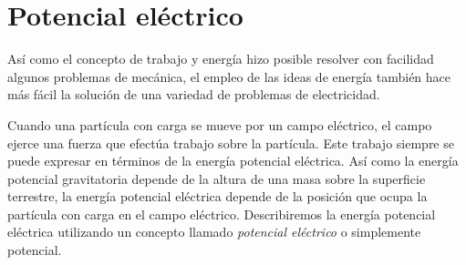 \section{Potencial eléctrico}
\label{sec:potencial}

Así como el concepto de trabajo y energía hizo posible resolver con facilidad algunos problemas de mecánica, el empleo de las ideas de energía también hace más fácil la solución de una variedad de problemas de electricidad.

Cuando una partícula con carga se mueve por un campo eléctrico, el campo ejerce una fuerza que efectúa trabajo sobre la partícula. Este trabajo siempre se puede expresar en términos de la energía potencial eléctrica. Así como la energía potencial gravitatoria depende de la altura de una masa sobre la superficie terrestre, la energía potencial eléctrica depende de la posición que ocupa la partícula con carga en el campo eléctrico. Describiremos la energía potencial eléctrica utilizando un concepto llamado \emph{potencial eléctrico} o simplemente potencial.

